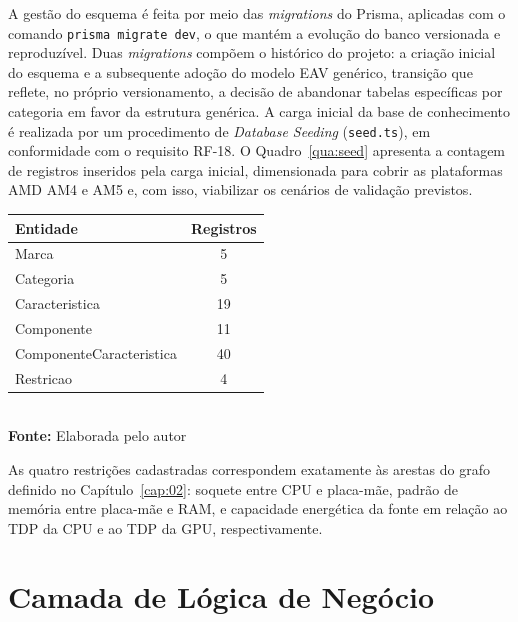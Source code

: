 A gestão do esquema é feita por meio das \textit{migrations} do Prisma, aplicadas com o comando \texttt{prisma migrate dev}, o que mantém a evolução do banco versionada e reproduzível. Duas \textit{migrations} compõem o histórico do projeto: a criação inicial do esquema e a subsequente adoção do modelo EAV genérico, transição que reflete, no próprio versionamento, a decisão de abandonar tabelas específicas por categoria em favor da estrutura genérica. A carga inicial da base de conhecimento é realizada por um procedimento de \textit{Database Seeding} (\texttt{seed.ts}), em conformidade com o requisito RF-18. O Quadro~\ref{qua:seed} apresenta a contagem de registros inseridos pela carga inicial, dimensionada para cobrir as plataformas AMD AM4 e AM5 e, com isso, viabilizar os cenários de validação previstos.

\FloatBarrier
\begin{quadro}[!htbp]
  \centering
  \caption{Registros criados pela carga inicial da base de conhecimento}
  \begin{tabular}{l c}
    \hline
    \textbf{Entidade}        & \textbf{Registros} \\ \hline
    Marca                    & 5                  \\ \hline
    Categoria                & 5                  \\ \hline
    Caracteristica           & 19                 \\ \hline
    Componente               & 11                 \\ \hline
    ComponenteCaracteristica & 40                 \\ \hline
    Restricao                & 4                  \\ \hline
  \end{tabular}
  \\ \vspace{0.2cm}
  \textbf{Fonte:} Elaborada pelo autor
  \label{qua:seed}
\end{quadro}
\FloatBarrier

As quatro restrições cadastradas correspondem exatamente às arestas do grafo definido no Capítulo~\ref{cap:02}: soquete entre CPU e placa-mãe, padrão de memória entre placa-mãe e RAM, e capacidade energética da fonte em relação ao TDP da CPU e ao TDP da GPU, respectivamente.

\section{Camada de Lógica de Negócio}
\label{sec:impl-logica}

